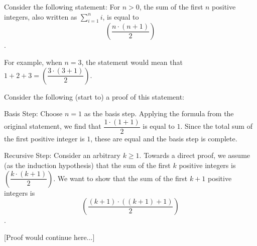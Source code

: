 
Consider the following statement: For $n > 0$, the sum of the first $n$ positive integers, also written as $\sum_{i=1}^n 
i$, is equal to $$\left(\dfrac{n \cdot (n + 1)}{2}\right)$$.

For example, when $n = 3$, the statement would mean that $1+2+3 = \left(\dfrac{3 \cdot (3 + 1)}{2}\right)$.

Consider the following (start to) a proof of this statement:

Basis Step: Choose $n = 1$ as the basis step. Applying the formula from the original statement, we find that $\dfrac{1 \cdot (1 + 1)}{2}$ is equal to $1$. Since the total sum of the first positive integer is $1$, these are equal and the basis step is complete.

Recursive Step: Consider an arbitrary $k \geq 1$.  Towards a direct proof, we assume (as the induction hypothesis) that the sum of the first $k$ positive integers is $\left(\dfrac{k \cdot (k + 1)}{2}\right)$. We want to show that the sum of the first $k + 1$ positive integers is $$\left( \dfrac{(k + 1) \cdot ((k + 1) + 1)}{2}\right)$$.

[Proof would continue here...]

